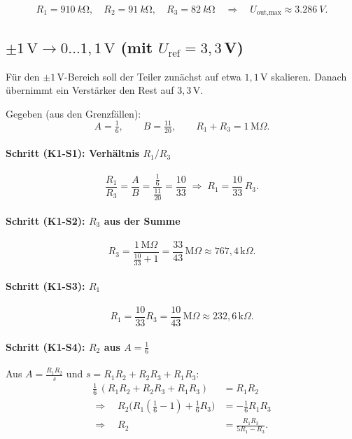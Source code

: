 \documentclass{article}
\begin{document}
	\[
	R_1=\SI{910}{k\ohm},\quad
	R_2=\SI{91}{k\ohm},\quad
	R_3=\SI{82}{k\ohm}\quad\Rightarrow\quad
	U_{\text{out,max}}\approx \SI{3.286}{V}.
	\]
	
	\subsection{\(\pm 1\,\text{V}\rightarrow 0\dots1{,}1\,\text{V}\) (mit \(U_\text{ref}=3{,}3\,\)V)}
	
	Für den \(\pm 1\,\mathrm{V}\)-Bereich soll der Teiler zunächst auf etwa \(1{,}1\,\mathrm{V}\) skalieren. Danach übernimmt ein Verstärker den Rest auf \(3{,}3\,\mathrm{V}\).
	
	Gegeben (aus den Grenzfällen):
	\[
	A=\tfrac{1}{6},\qquad B=\tfrac{11}{20},\qquad R_1+R_3=1\,\mathrm{M}\Omega.
	\]
	
	\paragraph{Schritt (K1-S1): Verhältnis \(R_1/R_3\)}
	
	\[
	\frac{R_1}{R_3}=\frac{A}{B}
	=\frac{\tfrac{1}{6}}{\tfrac{11}{20}}
	=\frac{10}{33}
	\;\Rightarrow\;
	R_1=\frac{10}{33}\,R_3.
	\]
	
	\paragraph{Schritt (K1-S2): \(R_3\) aus der Summe}
	
	\[
	R_3=\frac{1\,\mathrm{M}\Omega}{\tfrac{10}{33}+1}
	=\frac{33}{43}\,\mathrm{M}\Omega
	\approx 767{,}4\,\mathrm{k}\Omega.
	\]
	
	\paragraph{Schritt (K1-S3): \(R_1\)}
	
	\[
	R_1=\frac{10}{33}R_3
	=\frac{10}{43}\,\mathrm{M}\Omega
	\approx 232{,}6\,\mathrm{k}\Omega.
	\]
	
	\paragraph{Schritt (K1-S4): \(R_2\) aus \(A=\tfrac{1}{6}\)}
	
	Aus \(A=\frac{R_1R_2}{s}\) und \(s=R_1R_2+R_2R_3+R_1R_3\):
	\begin{align*}
		\frac{1}{6}\,(R_1R_2+R_2R_3+R_1R_3)&=R_1R_2\\
		\Rightarrow\quad R_2\bigl(R_1(\tfrac{1}{6}-1)+\tfrac{1}{6}R_3\bigr) &=-\tfrac{1}{6}R_1R_3\\
		\Rightarrow\quad 
		R_2&=\frac{R_1R_3}{5R_1-R_3}.
	\end{align*}
	
\end{document}
